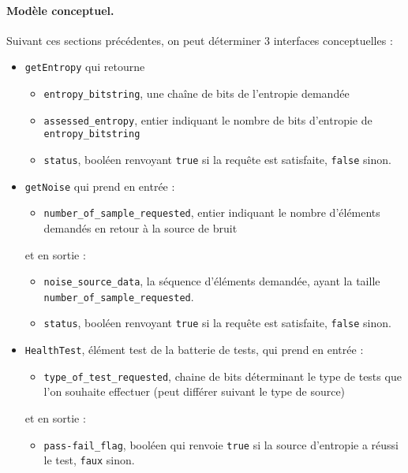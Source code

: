 \paragraph{Modèle conceptuel.\\}
Suivant ces sections précédentes, on peut déterminer 3 interfaces conceptuelles :
\begin{itemize}
\item \texttt{getEntropy} qui retourne 
	\begin{itemize}
	\item \texttt{entropy\_bitstring}, une chaîne de bits de l'entropie demandée
	\item \texttt{assessed\_entropy}, entier indiquant le nombre de bits d'entropie de \texttt{entropy\_bitstring}
	\item \texttt{status}, booléen renvoyant \texttt{true} si la requête est satisfaite, \texttt{false} sinon.\\
	\end{itemize}
\item \texttt{getNoise}	 qui prend en entrée : 
	\begin{itemize}
	\item \texttt{number\_of\_sample\_requested}, entier indiquant le nombre d'éléments demandés en retour à la source de bruit
	\end{itemize}
et en sortie : 
	\begin{itemize}
	\item \texttt{noise\_source\_data}, la séquence d'éléments demandée, ayant la taille \texttt{number\_of\_sample\_requested}.
	\item \texttt{status}, booléen renvoyant \texttt{true} si la requête est satisfaite, \texttt{false} sinon.\\
	\end{itemize}
\item \texttt{HealthTest}, élément test de la batterie de tests, qui prend en entrée :
	\begin{itemize}
	\item \texttt{type\_of\_test\_requested}, chaine de bits déterminant le type de tests que l'on souhaite effectuer (peut différer suivant le type de source)
	\end{itemize}
et en sortie : 
	\begin{itemize}
	\item \texttt{pass-fail\_flag}, booléen qui renvoie \texttt{true} si la source d'entropie a réussi le test, \texttt{faux} sinon.
	\end{itemize}	
\end{itemize}


